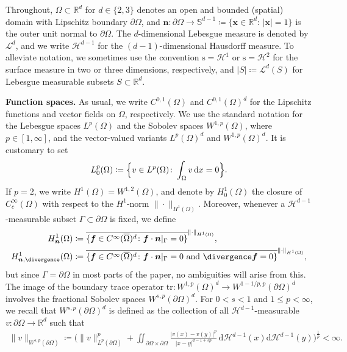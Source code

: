 \documentclass[reqno,a4paper]{amsart}
\def\vec#1{\boldsymbol{#1}}
\def\R{\mathbb{R}}
\def\d{{\rm d}}
\def\dx{\,\d x}
\def\Hn{ H^1_{\bn}(\Omega)}
\def\Hdivn{ H^1_{\bn,\divergence}(\Omega)}
\def\bf{\vec{f}}
\def\bn{\vec{n}}
\def\bx{\vec{x}}
\begin{document}
	Throughout, $\Omega\subset\R^{d}$ for $d \in \{2,3\}$ denotes an open and bounded (spatial) domain with Lipschitz boundary $\partial\Omega$, and $\bn\colon\partial\Omega\to\mathbb{S}^{d-1}\coloneqq \{\bx\in\R^{d}\colon\,|\bx|=1\}$ is the outer unit normal to $\partial\Omega$. 
	The $d$-dimensional Lebesgue measure is denoted by $\mathcal{L}^{d}$, and we write $\mathcal{H}^{d-1}$ for the $(d-1)$-dimensional Hausdorff measure. 
	To alleviate notation, we sometimes use the {convention $\mathrm{s}=\mathcal{H}^{1}$ or $\mathrm{s}=\mathcal{H}^{2}$ for the surface measure in two or three dimensions, respectively, and $|S|\coloneqq\mathcal{L}^{d}(S)$ for Lebesgue measurable subsets $S\subset \R^{d}$.} 
	
	\textbf{Function spaces.} 
	As usual, we write $C^{0,1}(\Omega)$ and $C^{0,1}(\Omega)^{d}$ for the Lipschitz functions and vector fields on $\Omega$, respectively. 
	We use the standard notation for the Lebesgue spaces $L^p(\Omega)$ and the Sobolev spaces $W^{1,p}(\Omega)$, where  $p \in [1,\infty]$, and the vector-valued variants $L^{p}(\Omega)^{d}$ and $W^{1,p}(\Omega)^{d}$. 
	It is customary to set 
	\begin{align*}
		L^p_0(\Omega)\coloneqq \Big\{v \in L^p(\Omega)\colon \int_{\Omega} v \dx = 0\Big\}.
	\end{align*}
	If $p=2$, we write $H^{1}(\Omega)=W^{1,2}(\Omega)$, and denote by $H_{0}^{1}(\Omega)$ the closure of $C_{c}^{\infty}(\Omega)$ with respect to the $H^{1}$-norm $\|\cdot\|_{H^{1}(\Omega)}$. 
	Moreover, whenever a $\mathcal{H}^{d-1}$-measurable subset $\Gamma\subset\partial\Omega$ is fixed, we define 
	\begin{align*}
		\Hn & \coloneqq \overline{\{\bf \in C^{\infty}(\overline \Omega)^d\colon \bf \cdot \bn |_{\Gamma} = 0 \}}^{\|\cdot\|_{H^{1}(\Omega)}}, \\ 
		\Hdivn & \coloneqq \overline{\{\bf \in C^{\infty}(\overline \Omega)^d\colon \bf \cdot \bn |_{\Gamma} = 0 \text{ and } \divergence \bf = 0\}}^{\|\cdot\|_{H^{1}(\Omega)}},
	\end{align*}
	but since $\Gamma=\partial\Omega$ in most parts of the paper, no ambiguities will arise from this. 
	The image of the boundary trace operator $\mathrm{tr}\colon W^{1,p}(\Omega)^{d}\to W^{1-1/p,p}(\partial\Omega)^{d}$ involves the fractional Sobolev spaces $W^{s,p}(\partial\Omega)^{d}$. 
	For $0<s<1$ and $1\leq p<\infty$, we recall that $W^{s,p}(\partial\Omega)^{d}$ is defined as the collection of all $\mathcal{H}^{d-1}$-measurable $v\colon\partial\Omega\to\R^{d}$ such that 
	\begin{align*}
		\|v\|_{W^{s,p}(\partial\Omega)}\coloneqq \Big(\|v\|_{L^{p}(\partial\Omega)}^{p}+\iint_{\partial\Omega\times\partial\Omega}\frac{|v(x)-v(y)|^{p}}{|x-y|^{d-1+sp}}\,\mathrm{d}\mathcal{H}^{d-1}(x)\mathrm{d}\mathcal{H}^{d-1}(y)\Big)^{\frac{1}{p}}<\infty. 
	\end{align*}
\end{document}
